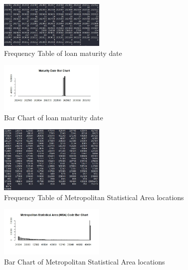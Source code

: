 \documentclass[10pt,twocolumn,letterpaper]{article}
\begin{document}
\begin{figure}
	\includegraphics[width=0.45\textwidth]{images/MaturityS.JPG}
	\caption{Frequency Table of loan maturity date}
	\label{fig:MaturityS}
\end{figure}
\begin{figure}
	\includegraphics[width=0.45\textwidth]{images/MaturityB.jpeg}
	\caption{Bar Chart of loan maturity date}
	\label{fig:MaturityB}
\end{figure}

\begin{figure}
	\includegraphics[width=0.45\textwidth]{images/MSAS.JPG}
	\caption{Frequency Table of Metropolitan Statistical Area locations}
	\label{fig:MSAS}
\end{figure}
\begin{figure}
	\includegraphics[width=0.45\textwidth]{images/MSAB.jpeg}
	\caption{Bar Chart of Metropolitan Statistical Area locations}
	\label{fig:MSAB}
\end{figure}
\end{document}
